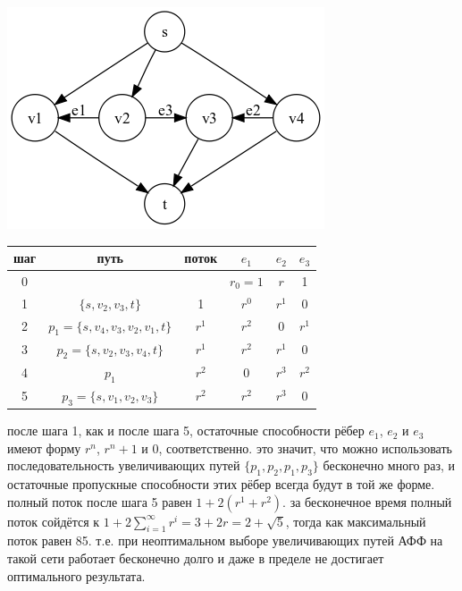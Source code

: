 \documentclass[russian]{article}
\begin{document}
\includegraphics[scale=0.5]{dm_4_m2_4}

\begin{tabular}{|c|c|c|c|c|c|}\hline
шаг	& путь & поток & $e_1$	& $e_2$ & $e_3$ \\\hline
0	&&	& $r_0 = 1$ &	$r$ & 1 \\\hline
1	& $\{s,v_2,v_3,t\}$ &	1	&$r^0$ &	$r^1$ &	0 \\\hline
2	& $p_1=\{s,v_4,v_3,v_2,v_1,t\}$	& $r^1$	& $r^2$ &	0 &	$r^1$ \\\hline
3	& $p_2=\{s,v_2,v_3,v_4,t\}$	& $r^1$	& $r^2$&	$r^1$ &	0\\\hline
4	& $p_1$	& $r^2$	& 0	& $r^3$ &	$r^2$\\\hline
5	& $p_3=\{s,v_1,v_2,v_3\}$	& $r^2$	& $r^2$	& $r^3$ &	0\\\hline
\end{tabular}

после шага 1, как и после шага 5, остаточные способности рёбер $e_1$, $e_2$ и $e_3$ имеют форму $r^n$, $r^n + 1$ и $0$, соответственно. это значит, что можно использовать последовательность увеличивающих путей $\{p_1,p_2,p_1,p_3\}$ бесконечно много раз, и остаточные пропускные способности этих рёбер всегда будут в той же форме. полный поток после шага 5 равен $1 + 2(r^1 + r^2)$. за бесконечное время полный поток сойдётся к $1+2\sum_{i=1}^\infty r^i=3+2r=2+\sqrt{5}$, тогда как максимальный поток равен 85. т.е. при неоптимальном выборе увеличивающих путей АФФ на такой сети работает бесконечно долго и даже в пределе не достигает оптимального результата.
\end{document}
